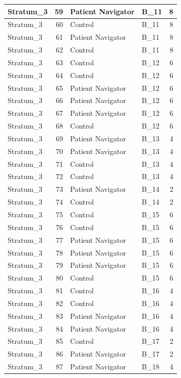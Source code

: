 \documentclass[
]{book}
\begin{document}
\begin{table}[H]
\begin{tabular}{l|r|l|l|r}
\hline
Stratum\_3 & 59 & Patient Navigator & B\_11 & 8\\
\hline
Stratum\_3 & 60 & Control & B\_11 & 8\\
\hline
Stratum\_3 & 61 & Patient Navigator & B\_11 & 8\\
\hline
Stratum\_3 & 62 & Control & B\_11 & 8\\
\hline
Stratum\_3 & 63 & Control & B\_12 & 6\\
\hline
Stratum\_3 & 64 & Control & B\_12 & 6\\
\hline
Stratum\_3 & 65 & Patient Navigator & B\_12 & 6\\
\hline
Stratum\_3 & 66 & Patient Navigator & B\_12 & 6\\
\hline
Stratum\_3 & 67 & Patient Navigator & B\_12 & 6\\
\hline
Stratum\_3 & 68 & Control & B\_12 & 6\\
\hline
Stratum\_3 & 69 & Patient Navigator & B\_13 & 4\\
\hline
Stratum\_3 & 70 & Patient Navigator & B\_13 & 4\\
\hline
Stratum\_3 & 71 & Control & B\_13 & 4\\
\hline
Stratum\_3 & 72 & Control & B\_13 & 4\\
\hline
Stratum\_3 & 73 & Patient Navigator & B\_14 & 2\\
\hline
Stratum\_3 & 74 & Control & B\_14 & 2\\
\hline
Stratum\_3 & 75 & Control & B\_15 & 6\\
\hline
Stratum\_3 & 76 & Control & B\_15 & 6\\
\hline
Stratum\_3 & 77 & Patient Navigator & B\_15 & 6\\
\hline
Stratum\_3 & 78 & Patient Navigator & B\_15 & 6\\
\hline
Stratum\_3 & 79 & Patient Navigator & B\_15 & 6\\
\hline
Stratum\_3 & 80 & Control & B\_15 & 6\\
\hline
Stratum\_3 & 81 & Control & B\_16 & 4\\
\hline
Stratum\_3 & 82 & Control & B\_16 & 4\\
\hline
Stratum\_3 & 83 & Patient Navigator & B\_16 & 4\\
\hline
Stratum\_3 & 84 & Patient Navigator & B\_16 & 4\\
\hline
Stratum\_3 & 85 & Control & B\_17 & 2\\
\hline
Stratum\_3 & 86 & Patient Navigator & B\_17 & 2\\
\hline
Stratum\_3 & 87 & Patient Navigator & B\_18 & 4\\

\end{tabular}
\end{table}
\end{document}
